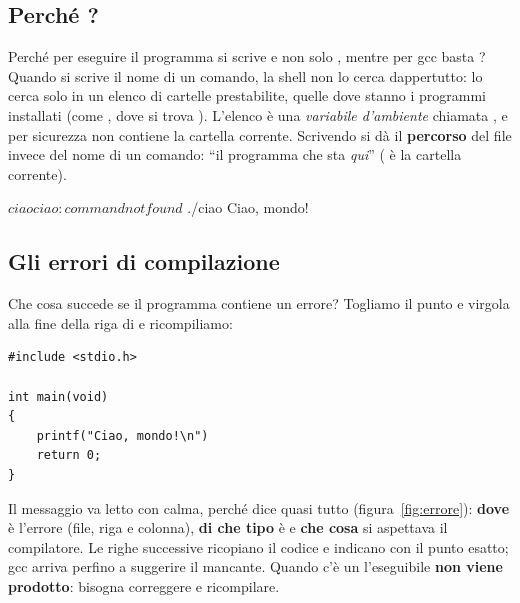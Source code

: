 \subsection{Perché ?}

Perché per eseguire il programma si scrive  e non solo
, mentre per gcc basta ? Quando si scrive il nome di un
comando, la shell non lo cerca dappertutto: lo cerca solo in un elenco di
cartelle prestabilite, quelle dove stanno i programmi installati (come
, dove si trova ). L'elenco è una
\textit{variabile d'ambiente} chiamata , e per sicurezza non
contiene la cartella corrente. Scrivendo  si dà il
\textbf{percorso} del file invece del nome di un comando: “il programma
 che sta \textit{qui}” ( è la cartella corrente).

\begin{console}
$ ciao
ciao: command not found
$ ./ciao
Ciao, mondo!
\end{console}

\subsection{Gli errori di compilazione}

Che cosa succede se il programma contiene un errore? Togliamo il punto e
virgola alla fine della riga di  e ricompiliamo:

\begin{affianco}[0.42][c]
\begin{lstlisting}[style=c, name=errore.c]
#include <stdio.h>

int main(void)
{
    printf("Ciao, mondo!\n")
    return 0;
}
\end{lstlisting}
\risultato
{}
\end{affianco}

Il messaggio va letto con calma, perché dice quasi tutto
(figura~\ref{fig:errore}): \textbf{dove} è l'errore (file, riga e colonna),
\textbf{di che tipo} è e \textbf{che cosa} si aspettava il compilatore. Le
righe successive ricopiano il codice e indicano con \code{\^{}} il punto
esatto; gcc arriva perfino a suggerire il \code{;} mancante. Quando c'è un
 l'eseguibile \textbf{non viene prodotto}: bisogna correggere e
ricompilare.

